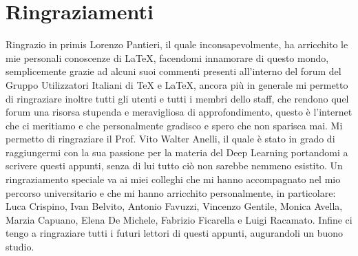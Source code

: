 \chapter*{Ringraziamenti}

Ringrazio in primis Lorenzo Pantieri, il quale inconsapevolmente, ha arricchito le mie personali conoscenze di \LaTeX, facendomi innamorare di questo mondo, semplicemente grazie ad alcuni suoi commenti presenti all'interno del forum del Gruppo Utilizzatori Italiani di \TeX{} e \LaTeX, ancora più in generale mi permetto di ringraziare inoltre tutti gli utenti e tutti i membri dello staff, che rendono quel forum una risorsa stupenda e meravigliosa di approfondimento, questo è l'internet che ci meritiamo e che personalmente gradisco e spero che non sparisca mai. Mi permetto di ringraziare il Prof. Vito Walter Anelli, il quale è stato in grado di raggiungermi con la sua passione per la materia del Deep Learning portandomi a scrivere questi appunti, senza di lui tutto ciò non sarebbe nemmeno esistito. Un ringraziamento speciale va ai miei colleghi che mi hanno accompagnato nel mio percorso universitario e che mi hanno arricchito personalmente, in particolare: Luca Crispino, Ivan Belvito, Antonio Favuzzi, Vincenzo Gentile, Monica Avella, Marzia Capuano, Elena De Michele, Fabrizio Ficarella e Luigi Racamato. Infine ci tengo a ringraziare tutti i futuri lettori di questi appunti, augurandoli un buono studio.
